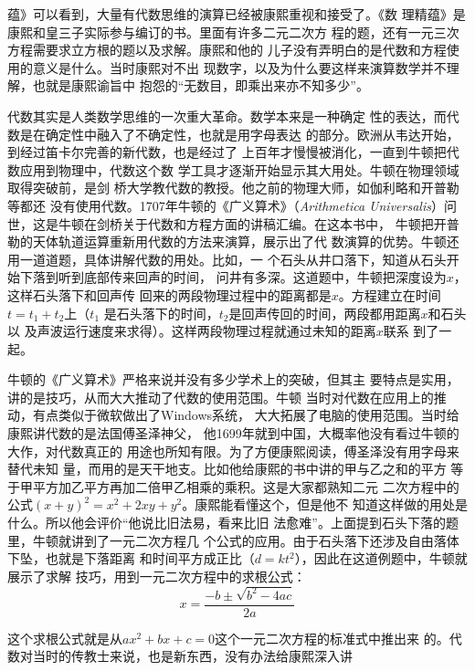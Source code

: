 蕴》可以看到，大量有代数思维的演算已经被康熙重视和接受了。《数%
理精蕴》是康熙和皇三子实际参与编订的书。里面有许多二元二次方%
程的题，还有一元三次方程需要求立方根的题以及求解。康熙和他的%
儿子没有弄明白的是代数和方程使用的意义是什么。当时康熙对不出%
现数字，以及为什么要这样来演算数学并不理解，也就是康熙谕旨中%
抱怨的“无数目，即乘出来亦不知多少”。%
\par
代数其实是人类数学思维的一次重大革命。数学本来是一种确定%
性的表达，而代数是在确定性中融入了不确定性，也就是用字母表达%
的部分。欧洲从韦达开始，到经过笛卡尔完善的新代数，也是经过了%
上百年才慢慢被消化，一直到牛顿把代数应用到物理中，代数这个数%
学工具才逐渐开始显示其大用处。牛顿在物理领域取得突破前，是剑%
桥大学教代数的教授。他之前的物理大师，如伽利略和开普勒等都还%
没有使用代数。1707年牛顿的《广义算术》（\textit{Arithmetica Universalis}）问%
世，这是牛顿在剑桥关于代数和方程方面的讲稿汇编。在这本书中，%
牛顿把开普勒的天体轨道运算重新用代数的方法来演算，展示出了代%
数演算的优势。牛顿还用一道道题，具体讲解代数的用处。比如，一%
个石头从井口落下，知道从石头开始下落到听到底部传来回声的时间，%
问井有多深。这道题中，牛顿把深度设为\(x\)，这样石头落下和回声传%
回来的两段物理过程中的距离都是\(x\)。方程建立在时间\(t=t_1+t_2\)上（\(t_1\)%
是石头落下的时间，\(t_2\)是回声传回的时间，两段都用距离\(x\)和石头以%
及声波运行速度来求得）。这样两段物理过程就通过未知的距离\(x\)联系%
到了一起。%
\par
牛顿的《广义算术》严格来说并没有多少学术上的突破，但其主%
要特点是实用，讲的是技巧，从而大大推动了代数的使用范围。牛顿%
当时对代数在应用上的推动，有点类似于微软做出了Windows系统，%
大大拓展了电脑的使用范围。当时给康熙讲代数的是法国傅圣泽神父，%
他1699年就到中国，大概率他没有看过牛顿的大作，对代数真正的%
用途也所知有限。为了方便康熙阅读，傅圣泽没有用字母来替代未知%
量，而用的是天干地支。比如他给康熙的书中讲的甲与乙之和的平方%
等于甲平方加乙平方再加二倍甲乙相乘的乘积。这是大家都熟知二元%
二次方程中的公式\((x+y)^2=x^2+2xy+y^2\)。康熙能看懂这个，但是他不%
知道这样做的用处是什么。所以他会评价“他说比旧法易，看来比旧%
法愈难”。上面提到石头下落的题里，牛顿就讲到了一元二次方程几%
个公式的应用。由于石头落下还涉及自由落体下坠，也就是下落距离%
和时间平方成正比（\(d=kt^2\)），因此在这道例题中，牛顿就展示了求解%
技巧，用到一元二次方程中的求根公式：%
\[\displaystyle x=\frac{-b\pm\sqrt{b^2-4ac}}{2a}\]
\par
这个求根公式就是从\(ax^2+bx+c=0\)这个一元二次方程的标准式中推出来%
的。代数对当时的传教士来说，也是新东西，没有办法给康熙深入讲%
